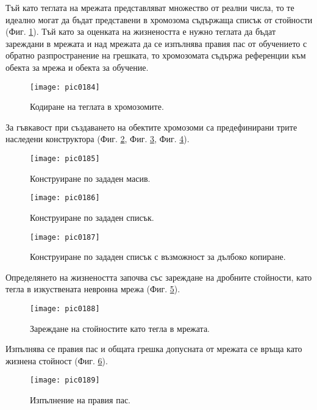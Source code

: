 Тъй като теглата на мрежата представляват множество от реални числа, то те идеално могат да бъдат представени в хромозома съдържаща списък от стойности (Фиг. \ref{fig:pic0184}). Тъй като за оценката на жизнеността е нужно теглата да бъдат зареждани в мрежата и над мрежата да се изпълнява правия пас от обучението с обратно разпространение на грешката, то хромозомата съдържа референции към обекта за мрежа и обекта за обучение. 

\begin{figure}[h]
  \centering
  \texttt{[image: pic0184]}
  \caption{Кодиране на теглата в хромозомите.}
\label{fig:pic0184}
\end{figure}
\FloatBarrier

За гъвкавост при създаването на обектите хромозоми са предефинирани трите наследени конструктора (Фиг. \ref{fig:pic0185}, Фиг. \ref{fig:pic0186}, Фиг. \ref{fig:pic0187}).

\begin{figure}[h]
  \centering
  \texttt{[image: pic0185]}
  \caption{Конструиране по зададен масив.}
\label{fig:pic0185}
\end{figure}
\FloatBarrier

\begin{figure}[h]
  \centering
  \texttt{[image: pic0186]}
  \caption{Конструиране по зададен списък.}
\label{fig:pic0186}
\end{figure}
\FloatBarrier

\begin{figure}[h]
  \centering
  \texttt{[image: pic0187]}
  \caption{Конструиране по зададен списък с възможност за дълбоко копиране.}
\label{fig:pic0187}
\end{figure}
\FloatBarrier

Определянето на жизнеността започва със зареждане на дробните стойности, като тегла в изкуствената невронна мрежа (Фиг. \ref{fig:pic0188}).

\begin{figure}[h]
  \centering
  \texttt{[image: pic0188]}
  \caption{Зареждане на стойностите като тегла в мрежата.}
\label{fig:pic0188}
\end{figure}
\FloatBarrier

Изпълнява се правия пас и общата грешка допусната от мрежата се връща като жизнена стойност (Фиг. \ref{fig:pic0189}).

\begin{figure}[h]
  \centering
  \texttt{[image: pic0189]}
  \caption{Изпълнение на правия пас.}
\label{fig:pic0189}
\end{figure}
\FloatBarrier

